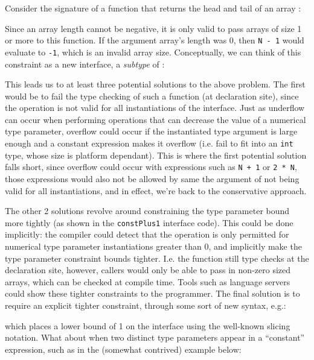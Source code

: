 Consider the signature of a function that returns the head and tail of an array
\autocite{rustConstBlog}:


Since an array length cannot be negative, it is only valid to pass arrays of
size 1 or more to this function. If the argument array's length was 0, then
\texttt{N - 1} would evaluate to \texttt{-1}, which is an invalid array size.
Conceptually, we can think of this constraint as a new interface, a
\emph{subtype} of :


This leads us to at least three potential solutions to the above problem. The
first would be to fail the type checking of such a function (at declaration
site), since the operation is not valid for all instantiations of the 
interface. Just as underflow can occur when performing operations that can
decrease the value of a numerical type parameter, overflow could occur if the
instantiated type argument is large enough and a constant expression makes it
overflow (i.e. fail to fit into an \texttt{int} type, whose size is platform
dependant). This is where the first potential solution falls short, since
overflow could occur with expressions such as \texttt{N + 1} or \texttt{2 * N},
those expressions would also not be allowed by same the argument of not being
valid for all instantiations, and in effect, we're back to the conservative
approach.

The other 2 solutions revolve around constraining the type parameter bound more
tightly (as shown in the \texttt{constPlus1} interface code). This could be done
implicitly: the compiler could detect that the operation is only permitted for
numerical type parameter instantiations greater than 0, and implicitly make the
type parameter constraint bounds tighter. I.e. the function still type checks at
the declaration site, however, callers would only be able to pass in non-zero
sized arrays, which can be checked at compile time. Tools such as language
servers could show these tighter constraints to the programmer. The final
solution is to require an explicit tighter constraint, through some sort of new
syntax, e.g.:


which places a lower bound of 1 on the  interface using the well-known
slicing notation. What about when two distinct type parameters appear in a
``constant'' expression, such as in the (somewhat contrived) example below:

